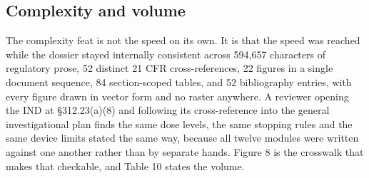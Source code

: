 \subsection{Complexity and volume}

The complexity feat is not the speed on its own. It is that the speed was
reached while the dossier stayed internally consistent across 594,657 characters
of regulatory prose, 52 distinct 21 CFR cross-references, 22 figures in a single
document sequence, 84 section-scoped tables, and 52 bibliography entries, with
every figure drawn in vector form and no raster anywhere. A reviewer opening the
IND at \S 312.23(a)(8) and following its cross-reference into the general
investigational plan finds the same dose levels, the same stopping rules and the
same device limits stated the same way, because all twelve modules were written
against one another rather than by separate hands. Figure 8 is the crosswalk
that makes that checkable, and Table 10 states the volume.

